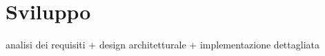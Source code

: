 \chapter{Sviluppo}\label{chap:Sviluppo}
analisi dei requisiti + design architetturale + implementazione dettagliata





